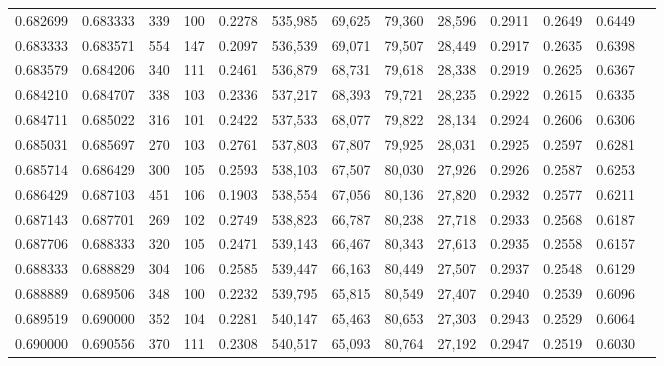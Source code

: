 \begin{tabular}{rrrrrrrrrrrrr}
0.682699 & 0.683333 &    339 &   100 &                                     0.2278 & 535,985 &  69,625 &  79,360 &  28,596 & 0.2911 & 0.2649 & 0.6449 \\
0.683333 & 0.683571 &    554 &   147 &                                     0.2097 & 536,539 &  69,071 &  79,507 &  28,449 & 0.2917 & 0.2635 & 0.6398 \\
0.683579 & 0.684206 &    340 &   111 &                                     0.2461 & 536,879 &  68,731 &  79,618 &  28,338 & 0.2919 & 0.2625 & 0.6367 \\
0.684210 & 0.684707 &    338 &   103 &                                     0.2336 & 537,217 &  68,393 &  79,721 &  28,235 & 0.2922 & 0.2615 & 0.6335 \\
0.684711 & 0.685022 &    316 &   101 &                                     0.2422 & 537,533 &  68,077 &  79,822 &  28,134 & 0.2924 & 0.2606 & 0.6306 \\
0.685031 & 0.685697 &    270 &   103 &                                     0.2761 & 537,803 &  67,807 &  79,925 &  28,031 & 0.2925 & 0.2597 & 0.6281 \\
0.685714 & 0.686429 &    300 &   105 &                                     0.2593 & 538,103 &  67,507 &  80,030 &  27,926 & 0.2926 & 0.2587 & 0.6253 \\
0.686429 & 0.687103 &    451 &   106 &                                     0.1903 & 538,554 &  67,056 &  80,136 &  27,820 & 0.2932 & 0.2577 & 0.6211 \\
0.687143 & 0.687701 &    269 &   102 &                                     0.2749 & 538,823 &  66,787 &  80,238 &  27,718 & 0.2933 & 0.2568 & 0.6187 \\
0.687706 & 0.688333 &    320 &   105 &                                     0.2471 & 539,143 &  66,467 &  80,343 &  27,613 & 0.2935 & 0.2558 & 0.6157 \\
0.688333 & 0.688829 &    304 &   106 &                                     0.2585 & 539,447 &  66,163 &  80,449 &  27,507 & 0.2937 & 0.2548 & 0.6129 \\
0.688889 & 0.689506 &    348 &   100 &                                     0.2232 & 539,795 &  65,815 &  80,549 &  27,407 & 0.2940 & 0.2539 & 0.6096 \\
0.689519 & 0.690000 &    352 &   104 &                                     0.2281 & 540,147 &  65,463 &  80,653 &  27,303 & 0.2943 & 0.2529 & 0.6064 \\
0.690000 & 0.690556 &    370 &   111 &                                     0.2308 & 540,517 &  65,093 &  80,764 &  27,192 & 0.2947 & 0.2519 & 0.6030 \\

\end{tabular}
